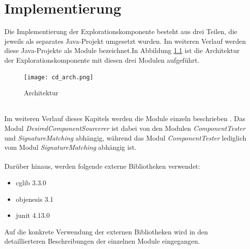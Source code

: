 \chapter{Implementierung}\label{chap_impl}
Die Implementierung der Explorationskomponente besteht aus drei Teilen, die jeweils als separates Java-Projekt umgesetzt wurden. Im weiteren Verlauf werden diese Java-Projekte als \Gls{Modul}e bezeichnet.In Abbildung \ref{cd_arch} ist die Architektur der Explorationskomponente mit diesen drei \Gls{Modul}en aufgeführt.
\begin{figure}[h!]
\centering
\texttt{[image: cd\_arch.png]}
\caption{Architektur}
\label{cd_arch}
\end{figure}
\noindent
\\
Im weiteren Verlauf dieses Kapitels werden die \Gls{Modul}e einzeln beschrieben . Das \Gls{Modul} \emph{DesiredComponentSourcerer} ist dabei von den \Gls{Modul}en \emph{ComponentTester} und \emph{SignatureMatching} abhängig, während das \Gls{Modul} \emph{ComponentTester} lediglich vom \Gls{Modul} \emph{SignatureMatching} abhängig ist.
\\\\
Darüber hinaus, werden folgende externe Bibliotheken verwendet:
\begin{itemize}
\item cglib 3.3.0 \cite{cglib}
\item objenesis 3.1 \cite{objenesis}
\item junit 4.13.0 \cite{junit}
\end{itemize}
Auf die konkrete Verwendung der externen Bibliotheken wird in den detaillierteren Beschreibungen der einzelnen \Gls{Modul}e eingegangen.
